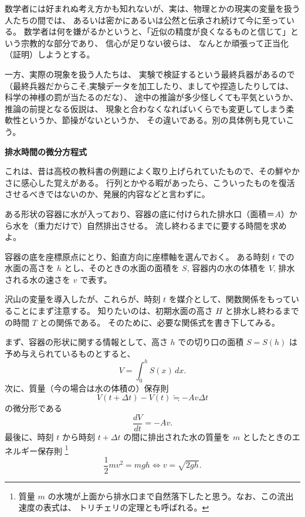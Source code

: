 \documentclass[a4paper]{jsarticle}
\theoremstyle{definition}
\theoremstyle{remark}
\begin{document}
数学者には好まれぬ考え方かも知れないが、実は、物理とかの現実の変量を扱う人たちの間では、
あるいは密かにあるいは公然と伝承され続けて今に至っている。
数学者は何を嫌がるかというと、「近似の精度が良くなるものと信じて」という宗教的な部分であり、
信心が足りない彼らは、
なんとか頑張って正当化（証明）しようとする。

一方、実際の現象を扱う人たちは、
実験で検証するという最終兵器があるので
（最終兵器だからこそ,実験データを加工したり、ましてや捏造したりしては、科学の神様の罰が当たるのだな）、
途中の推論が多少怪しくても平気というか、推論の前提となる仮説は、
現象と合わなくなればいくらでも変更してしまう柔軟性というか、節操がないというか、
その違いである。別の具体例も見ていこう。

\bigskip
\noindent
\textbf{排水時間の微分方程式}

これは、昔は高校の教科書の例題によく取り上げられていたもので、その鮮やかさに感心した覚えがある。
行列とかやる暇があったら、こういったものを復活させるべきではないのか、発展的内容などと言わずに。

ある形状の容器に水が入っており、容器の底に付けられた排水口（面積＝$A$）から水を（重力だけで）自然排出させる。
流し終わるまでに要する時間を求めよ。

容器の底を座標原点にとり、鉛直方向に座標軸を選んでおく。
ある時刻 $t$ での水面の高さを $h$ とし、そのときの水面の面積を $S$, 容器内の水の体積を $V$, 
排水される水の速さを $v$ で表す。

沢山の変量を導入したが、これらが、時刻 $t$ を媒介として、関数関係をもっていることにまず注意する。
知りたいのは、初期水面の高さ $H$ と排水し終わるまでの時間 $T$ との関係である。
そのために、必要な関係式を書き下してみる。

まず、容器の形状に関する情報として、高さ $h$ での切り口の面積
 $S=S(h)$ は予め与えられているものとすると、
\[
V = \int_0^h S(x)\, dx. 
\]
次に、質量（今の場合は水の体積の）保存則
\[
V(t+\Delta t) - V(t) \fallingdotseq - Av \Delta t
\]
の微分形である
\[
\frac{dV}{dt} = - Av. 
\]
最後に、時刻 $t$ から時刻 $t + \Delta t$ の間に排出された水の質量を $m$ としたときのエネルギー保存則
\footnote{質量 $m$ の水塊が上面から排水口まで自然落下したと思う。なお、この流出速度の表式は、
トリチェリの定理とも呼ばれる。}
\[
\frac{1}{2}mv^2 = mgh \iff 
v = \sqrt{2gh}. 
\] 
\end{document}
